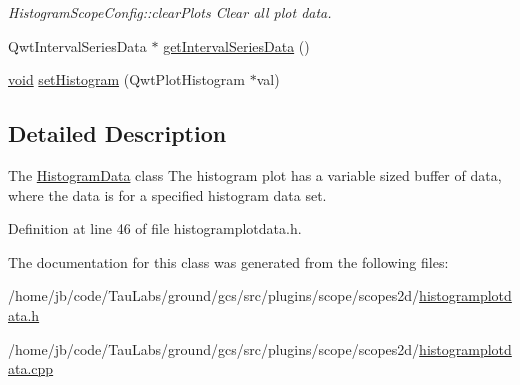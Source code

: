 \begin{DoxyCompactItemize}
\begin{DoxyCompactList}\small\item\em \-Histogram\-Scope\-Config\-::clear\-Plots \-Clear all plot data. \end{DoxyCompactList}\item 
\-Qwt\-Interval\-Series\-Data $\ast$ \hyperlink{group___scope_plugin_ga025ada984f64906121e98805e9ab43b4}{get\-Interval\-Series\-Data} ()
\item 
\hyperlink{group___u_a_v_objects_plugin_ga444cf2ff3f0ecbe028adce838d373f5c}{void} \hyperlink{group___scope_plugin_ga2f4dbd730d5616dbd15922f23f775d02}{set\-Histogram} (\-Qwt\-Plot\-Histogram $\ast$val)
\end{DoxyCompactItemize}


\subsection{\-Detailed \-Description}
\-The \hyperlink{class_histogram_data}{\-Histogram\-Data} class \-The histogram plot has a variable sized buffer of data, where the data is for a specified histogram data set. 

\-Definition at line 46 of file histogramplotdata.\-h.



\-The documentation for this class was generated from the following files\-:\begin{DoxyCompactItemize}
\item 
/home/jb/code/\-Tau\-Labs/ground/gcs/src/plugins/scope/scopes2d/\hyperlink{histogramplotdata_8h}{histogramplotdata.\-h}\item 
/home/jb/code/\-Tau\-Labs/ground/gcs/src/plugins/scope/scopes2d/\hyperlink{histogramplotdata_8cpp}{histogramplotdata.\-cpp}\end{DoxyCompactItemize}
